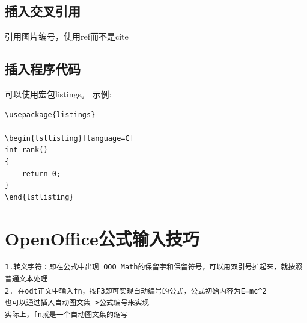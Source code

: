 \subsection{插入交叉引用}
引用图片编号，使用ref而不是cite

\subsection{插入程序代码}
可以使用宏包listings。
示例:
\begin{verbatim}
\usepackage{listings} 

\begin{lstlisting}[language=C]
int rank()
{ 
    return 0;
}
\end{lstlisting}
\end{verbatim}


\section{OpenOffice公式输入技巧}
\begin{verbatim}
1.转义字符：即在公式中出现 OOO Math的保留字和保留符号，可以用双引号扩起来，就按照普通文本处理
2. 在odt正文中输入fn，按F3即可实现自动编号的公式，公式初始内容为E=mc^2
也可以通过插入自动图文集->公式编号来实现
实际上，fn就是一个自动图文集的缩写
\end{verbatim}
